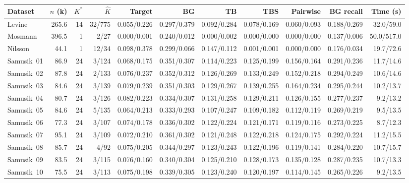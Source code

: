 \begin{tabular}{lrrrrrrrrrr}
\toprule
Dataset & $n$ (k) & $K^*$ & $\hat K$ & Target & BG & TB & TBS & Pairwise & BG recall & Time (s) \\
\midrule
Levine & 265.6 & 14 & 32/775 & 0.055/0.226 & 0.297/0.379 & 0.092/0.284 & 0.078/0.169 & 0.060/0.093 & 0.188/0.269 & 32.0/59.0 \\
Mosmann & 396.5 & 1 & 2/27 & 0.000/0.001 & 0.240/0.012 & 0.000/0.002 & 0.000/0.000 & 0.000/0.000 & 0.137/0.006 & 50.0/517.0 \\
Nilsson & 44.1 & 1 & 12/34 & 0.098/0.378 & 0.299/0.066 & 0.147/0.112 & 0.001/0.001 & 0.000/0.000 & 0.176/0.034 & 19.7/72.6 \\
Samusik\ 01 & 86.9 & 24 & 3/124 & 0.068/0.175 & 0.351/0.307 & 0.114/0.223 & 0.125/0.199 & 0.156/0.164 & 0.291/0.236 & 11.7/14.6 \\
Samusik\ 02 & 87.8 & 24 & 2/133 & 0.076/0.237 & 0.352/0.312 & 0.126/0.269 & 0.133/0.249 & 0.152/0.218 & 0.294/0.249 & 10.6/14.6 \\
Samusik\ 03 & 84.6 & 24 & 3/139 & 0.079/0.239 & 0.351/0.303 & 0.129/0.267 & 0.139/0.255 & 0.164/0.234 & 0.295/0.244 & 10.2/13.7 \\
Samusik\ 04 & 80.7 & 24 & 3/126 & 0.082/0.223 & 0.334/0.307 & 0.131/0.258 & 0.129/0.211 & 0.126/0.155 & 0.277/0.237 & 9.2/13.2 \\
Samusik\ 05 & 84.6 & 24 & 5/135 & 0.064/0.213 & 0.333/0.293 & 0.107/0.247 & 0.109/0.182 & 0.112/0.119 & 0.269/0.219 & 9.5/13.5 \\
Samusik\ 06 & 77.3 & 24 & 3/107 & 0.074/0.178 & 0.336/0.302 & 0.122/0.224 & 0.121/0.171 & 0.119/0.116 & 0.273/0.225 & 8.7/12.3 \\
Samusik\ 07 & 95.1 & 24 & 3/109 & 0.072/0.210 & 0.361/0.302 & 0.121/0.248 & 0.122/0.218 & 0.124/0.175 & 0.292/0.224 & 11.2/15.5 \\
Samusik\ 08 & 85.7 & 24 & 4/92 & 0.075/0.205 & 0.344/0.297 & 0.123/0.243 & 0.122/0.196 & 0.119/0.141 & 0.284/0.220 & 10.7/15.7 \\
Samusik\ 09 & 83.5 & 24 & 3/115 & 0.076/0.160 & 0.340/0.304 & 0.125/0.210 & 0.128/0.173 & 0.135/0.128 & 0.287/0.235 & 10.7/13.3 \\
Samusik\ 10 & 75.5 & 24 & 3/113 & 0.075/0.198 & 0.339/0.305 & 0.123/0.240 & 0.120/0.197 & 0.114/0.145 & 0.265/0.226 & 9.2/13.5 \\
\bottomrule
\end{tabular}
